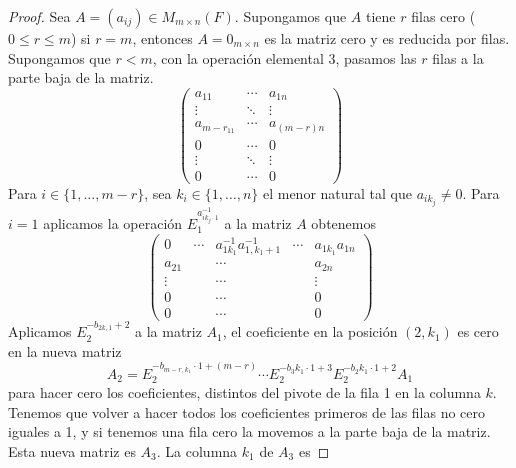 \documentclass[12pt,a4paper]{book}
\begin{document}
    \begin{proof}
        Sea $A=(a_{ij})\in M_{m\times n}(F)$. Supongamos que $A$ tiene $r$ filas cero ($0\leq r\leq m$) si $r=m$,
        entonces $A=0_{m\times n}$ es la matriz cero y es reducida por filas. Supongamos que $r\lt m$,
        con la operación elemental 3, pasamos las $r$ filas a la parte baja de la matriz.
        \begin{equation*}
            \begin{pmatrix}
                a_{11} & \cdots & a_{1n}\\
                \vdots & \ddots & \vdots\\
                a_{m-r_{11}}& \cdots & a_{(m-r)n}\\
                0 & \cdots & 0\\
                \vdots & \ddots & \vdots\\
                0 & \cdots & 0
            \end{pmatrix}
        \end{equation*}
        Para $i\in\{1,\dots,m-r\}$, sea $k_{i}\in\{1,\dots,n\}$ el menor natural tal que $a_{ik_{j}}\neq0$. Para $i=1$
        aplicamos la operación $E_{1}^{a_{ik_{j}\cdot1}^{-1}}$ a la matriz $A$ obtenemos
        \begin{equation*}
            \begin{pmatrix}
                0 & \cdots & a_{1k_{1}}^{-1}a_{1,k_{1}+1}^{-1} & \cdots & a_{1k_{1}}a_{1n}\\
                a_{21} & & \cdots & & a_{2n}\\
                \vdots & & \cdots & & \vdots\\
                0 & & \cdots & & 0\\
                0 & & \cdots & & 0
            \end{pmatrix}
        \end{equation*}
        Aplicamos $E_{2}^{-b_{2k,1}+2}$ a la matriz $A_{1}$, el coeficiente en la posición $(2,k_{1})$ es cero en la nueva
        matriz
        \begin{equation*}
            A_{2}=E_{2}^{-b_{m-r,k_{1}}\cdot 1+(m-r)}\cdots E_{2}^{-b_{3}k_{1}\cdot1+3}E_{2}^{-b_{2}k_{1}\cdot1+2}A_{1}
        \end{equation*}
        para hacer cero los coeficientes, distintos del pivote de la fila 1 en la columna $k$. Tenemos que volver a
        hacer todos los coeficientes primeros de las filas no cero iguales a 1, y si tenemos una fila cero la movemos a la parte
        baja de la matriz. Esta nueva matriz es $A_{3}$. La columna $k_{1}$ de $A_{3}$ es

\end{proof}
\end{document}
